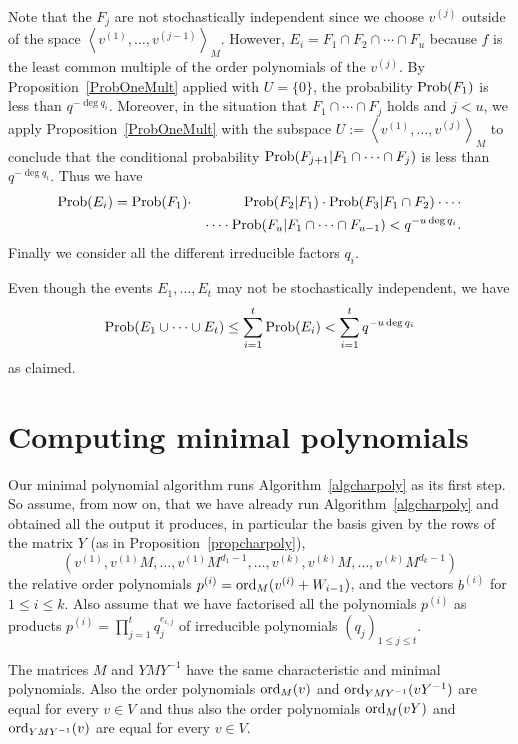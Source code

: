 Note that
the $F_j$ are not stochastically independent since we choose
$v^{(j)}$ outside of the space $\left< v^{(1)}, \ldots, v^{(j-1)}\right>_M$.
However, $E_i = F_1 \cap F_2 \cap \cdots \cap F_u$ because $f$ is the
least common multiple of the order polynomials of the $v^{(j)}$.
By Proposition~\ref{ProbOneMult} applied with $U=\{0\}$, 
the probability $\mathrm{Prob}(F_1)$
is less than $q^{-\deg q_i}$. Moreover, in the situation that 
$F_1 \cap \cdots \cap F_j$ holds and $j<u$,
we apply Proposition~\ref{ProbOneMult} with the
subspace $U := \left< v^{(1)}, \ldots, v^{(j)} \right>_M$ to conclude
that the conditional probability $\mathrm{Prob}(F_{j+1} | F_1 \cap \cdots \cap F_j)$
is less than $q^{-\deg q_i}$.
Thus we have
\begin{eqnarray*}
\mathrm{Prob}(E_i) = \mathrm{Prob}(F_1)&\cdot& \mathrm{Prob}(F_2 | F_1) \cdot \mathrm{Prob}(F_3 | F_1 \cap F_2)
   \cdot \cdots \\
    && \cdots \cdot \mathrm{Prob}(F_u | F_1 \cap \cdots \cap F_{u-1}) 
   < q^{-u\deg q_i}.
\end{eqnarray*}
Finally we consider all the different irreducible factors $q_i$. 

Even though
the events $E_1,\ldots,E_t$ may not be stochastically independent, we have
\[ \mathrm{Prob}( E_1 \cup \cdots \cup E_t ) \le \sum_{i=1}^t \mathrm{Prob}(E_i)
   < \sum_{i=1}^t q^{-u\deg q_i} \]
as claimed.
\proofend

\section{Computing minimal polynomials}
\label{minpoly}

Our minimal polynomial algorithm runs Algorithm~\ref{algcharpoly} as its
first step. So assume, from now on,
that we have already run Algorithm~\ref{algcharpoly}
and obtained all the output it produces, in particular
the basis given by the rows of the matrix $Y$ (as in Proposition~\ref{propcharpoly}),
\[ 
(v^{(1)}, v^{(1)}M, \ldots, v^{(1)} M^{d_1-1}, \ldots, v^{(k)}, 
v^{(k)} M, \ldots, v^{(k)} M^{d_k-1}) 
\]
the relative order polynomials $p^{(i)} = \mathrm{ord}_M(v^{(i)}
+ W_{i-1})$, and the vectors $b^{(i)}$ for $1 \le i \le k$.
Also assume that we have factorised all the polynomials $p^{(i)}$
as products $p^{(i)} = \prod_{j=1}^t q_j^{e_{i,j}}$ of irreducible 
polynomials $(q_j)_{1 \le j \le t}$.

The matrices $M$ and $YMY^{-1}$ have the same characteristic
and minimal polynomials. Also the order polynomials $\mathrm{ord}_M(v)$ and
$\mathrm{ord}_{YMY^{-1}}(vY^{-1})$ are equal for every $v \in V$ and thus also
the order polynomials $\mathrm{ord}_M(vY)$ and $\mathrm{ord}_{YMY^{-1}}(v)$ are equal for every
$v \in V$.

